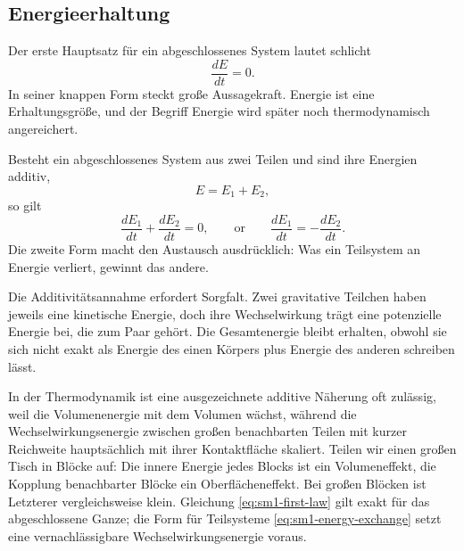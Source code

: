 \subsection{Energieerhaltung}

Der erste Hauptsatz für ein abgeschlossenes System lautet schlicht
\begin{equation}
 \frac{dE}{dt}=0.
 \label{eq:sm1-first-law}
\end{equation}
In seiner knappen Form steckt große Aussagekraft. Energie ist eine Erhaltungsgröße, und der Begriff Energie wird später noch thermodynamisch angereichert.

Besteht ein abgeschlossenes System aus zwei Teilen und sind ihre Energien additiv,
\begin{equation}
 E=E_1+E_2,
\end{equation}
so gilt
\begin{equation}
 \frac{dE_1}{dt}+\frac{dE_2}{dt}=0,
 \qquad\text{or}\qquad
 \frac{dE_1}{dt}=-\frac{dE_2}{dt}.
 \label{eq:sm1-energy-exchange}
\end{equation}
Die zweite Form macht den Austausch ausdrücklich: Was ein Teilsystem an Energie verliert, gewinnt das andere.

Die Additivitätsannahme erfordert Sorgfalt. Zwei gravitative Teilchen haben jeweils eine kinetische Energie, doch ihre Wechselwirkung trägt eine potenzielle Energie bei, die zum Paar gehört. Die Gesamtenergie bleibt erhalten, obwohl sie sich nicht exakt als Energie des einen Körpers plus Energie des anderen schreiben lässt.

In der Thermodynamik ist eine ausgezeichnete additive Näherung oft zulässig, weil die Volumenenergie mit dem Volumen wächst, während die Wechselwirkungsenergie zwischen großen benachbarten Teilen mit kurzer Reichweite hauptsächlich mit ihrer Kontaktfläche skaliert. Teilen wir einen großen Tisch in Blöcke auf: Die innere Energie jedes Blocks ist ein Volumeneffekt, die Kopplung benachbarter Blöcke ein Oberflächeneffekt. Bei großen Blöcken ist Letzterer vergleichsweise klein. Gleichung \eqref{eq:sm1-first-law} gilt exakt für das abgeschlossene Ganze; die Form für Teilsysteme \eqref{eq:sm1-energy-exchange} setzt eine vernachlässigbare Wechselwirkungsenergie voraus.

\begin{classroomqa}\end{classroomqa}

